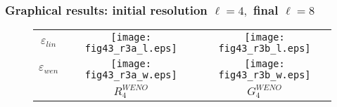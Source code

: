 \documentclass[xcolor=dvipsnames,9pt,mathserif]{beamer}
\newcommand{\vs}{\vskip 0.3truecm}
\newcommand{\coll}[1]{\emph{\color{red} #1}}
\newcommand{\col}[1]{{\bf\color{PineGreen} #1}}
\begin{document}
\begin{frame}
\frametitle{Graphical results: initial resolution $\ell=4,$ final ${\ell}=8$}

\begin{figure}[h!]
  \begin{center}
\begin{tabular}{ccc}
$\varepsilon_{lin}$ &\texttt{[image: fig43\_r3a\_l.eps]}\quad   &
\texttt{[image: fig43\_r3b\_l.eps]} \\[.2cm]
$\varepsilon_{wen}$ &\texttt{[image: fig43\_r3a\_w.eps]}\quad   &
\texttt{[image: fig43\_r3b\_w.eps]} \\
& $R^{WENO}_4$ & $G^{WENO}_4$\\
\end{tabular}
  \end{center}
\end{figure}
\end{frame}
%
%
%
%
%
%
\end{document}
